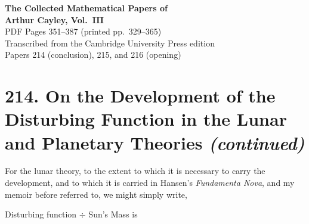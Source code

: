 \documentclass[12pt,a4paper]{article}
\theoremstyle{plain}
\begin{document}
\begin{center}
{\Large\bfseries The Collected Mathematical Papers of\\[0.5em] Arthur Cayley, Vol.~III}\\[2em]
{\large PDF Pages 351--387 (printed pp.~329--365)}\\[1em]
{\normalsize Transcribed from the Cambridge University Press edition}\\[0.5em]
{\small Papers 214 (conclusion), 215, and 216 (opening)}
\end{center}

\vspace{2em}

\tableofcontents
\newpage


\section*{214. On the Development of the Disturbing Function in the Lunar and Planetary Theories \textit{(continued)}}

 For the lunar theory, to the extent to which it is necessary to carry the development, and to which it is carried in Hansen's \textit{Fundamenta Nova}, and my memoir before referred to, we might simply write,

\bigskip
\noindent Disturbing function $\div$ Sun's Mass is
\end{document}
